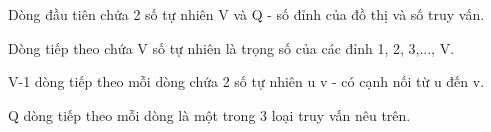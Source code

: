 Dòng đầu tiên chứa 2 số tự nhiên V và Q - số đỉnh của đồ thị và số truy vấn.

Dòng tiếp theo chứa V số tự nhiên là trọng số của các đỉnh 1, 2, 3,..., V.

V-1 dòng tiếp theo mỗi dòng chứa 2 số tự nhiên u v - có cạnh nối từ u đến v.

Q dòng tiếp theo mỗi dòng là một trong 3 loại truy vấn nêu trên.
